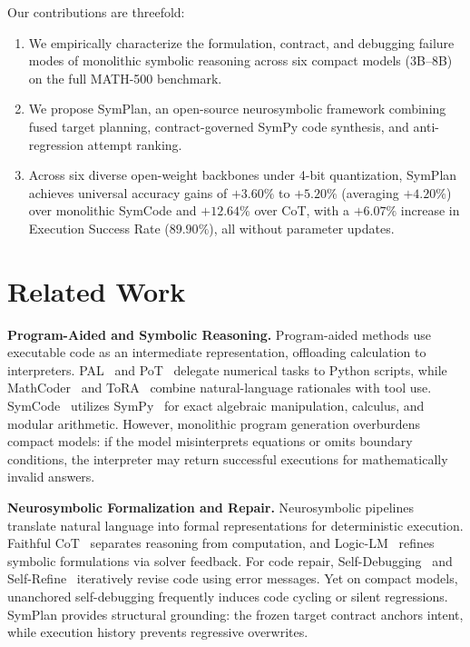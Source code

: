 \documentclass[conference,a4paper]{IEEEtran}
\begin{document}
Our contributions are threefold:
\begin{enumerate}
    \item We empirically characterize the formulation, contract, and debugging failure modes of monolithic symbolic reasoning across six compact models (3B--8B) on the full MATH-500 benchmark.
    \item We propose SymPlan, an open-source neurosymbolic framework combining fused target planning, contract-governed SymPy code synthesis, and anti-regression attempt ranking.
    \item Across six diverse open-weight backbones under 4-bit quantization, SymPlan achieves universal accuracy gains of $+3.60\%$ to $+5.20\%$ (averaging $+4.20\%$) over monolithic SymCode and $+12.64\%$ over CoT, with a $+6.07\%$ increase in Execution Success Rate ($89.90\%$), all without parameter updates.
\end{enumerate}

\section{Related Work}

\textbf{Program-Aided and Symbolic Reasoning.} Program-aided methods use executable code as an intermediate representation, offloading calculation to interpreters. PAL~\cite{gao2023pal} and PoT~\cite{chen2022pot} delegate numerical tasks to Python scripts, while MathCoder~\cite{wang2024mathcoder} and ToRA~\cite{gou2024tora} combine natural-language rationales with tool use. SymCode~\cite{nezhad2025symcode} utilizes SymPy~\cite{meurer2017sympy} for exact algebraic manipulation, calculus, and modular arithmetic. However, monolithic program generation overburdens compact models: if the model misinterprets equations or omits boundary conditions, the interpreter may return successful executions for mathematically invalid answers.

\textbf{Neurosymbolic Formalization and Repair.} Neurosymbolic pipelines translate natural language into formal representations for deterministic execution. Faithful CoT~\cite{lyu2023faithful} separates reasoning from computation, and Logic-LM~\cite{pan2023logiclm} refines symbolic formulations via solver feedback. For code repair, Self-Debugging~\cite{chen2024selfdebug} and Self-Refine~\cite{madaan2023selfrefine} iteratively revise code using error messages. Yet on compact models, unanchored self-debugging frequently induces code cycling or silent regressions. SymPlan provides structural grounding: the frozen target contract anchors intent, while execution history prevents regressive overwrites.
\end{document}
